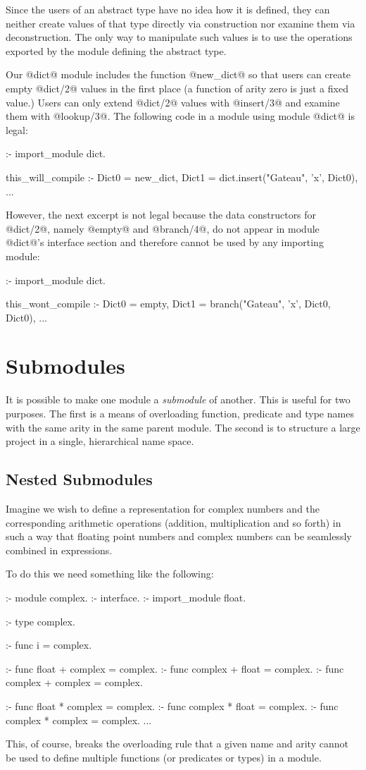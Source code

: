 Since the users of an abstract type have no idea how it is defined, they
can neither create values of that type directly via construction nor
examine them via deconstruction.  The only way
to manipulate such values is to use the operations exported by the
module defining the abstract type.

Our @dict@ module includes the function @new_dict@ so that users can create
empty @dict/2@ values in the first place (a function of arity zero is just
a fixed value.) Users can only extend @dict/2@ values with @insert/3@
and examine them with @lookup/3@.  The following code in a module using
module @dict@ is legal:
\begin{myverbatim}
:- import_module dict.

this_will_compile :-
    Dict0 = new_dict,
    Dict1 = dict.insert("Gateau", 'x', Dict0),
    ...
\end{myverbatim}
However, the next excerpt is not legal because the data
constructors for @dict/2@, namely @empty@ and @branch/4@, do not appear in
module @dict@'s interface section and therefore cannot be used by any
importing module:
\begin{myverbatim}
:- import_module dict.

this_wont_compile :-
    Dict0 = empty,
    Dict1 = branch("Gateau", 'x', Dict0, Dict0),
    ...
\end{myverbatim}

\section{Submodules}

It is possible to make one module a \emph{submodule} of another.  This
is useful for two purposes.  The first is a means of overloading
function, predicate and type names with the same arity in the same
parent module.  The second is to structure a large project in a
single, hierarchical name space.

\subsection{Nested Submodules}

Imagine we wish to define a representation for complex numbers and the
corresponding arithmetic operations (addition, multiplication and so
forth) in such a way that floating point numbers and complex numbers can
be seamlessly combined in expressions.

To do this we need something like the following:
\begin{myverbatim}
:- module complex.
:- interface. 
:- import_module float.

:- type complex.

:- func i = complex.

:- func float   + complex = complex.
:- func complex + float   = complex.
:- func complex + complex = complex.

:- func float   * complex = complex.
:- func complex * float   = complex.
:- func complex * complex = complex.
...
\end{myverbatim}
This, of course, breaks the overloading rule that a given name and arity
cannot be used to define multiple functions (or predicates or types) in
a module.

